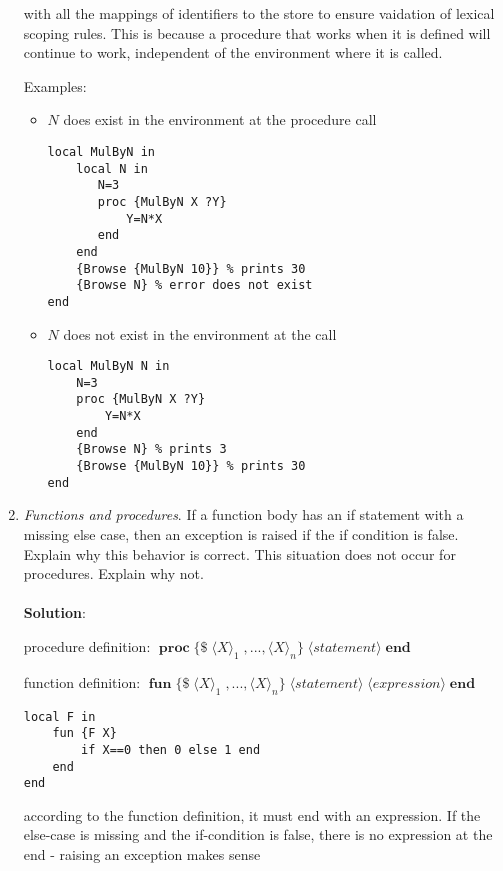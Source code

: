 \documentclass[11pt]{article}
\begin{document}
\begin{enumerate}
with all the mappings of identifiers to the store to ensure vaidation of lexical scoping rules.
This is because a procedure that works when it is deﬁned will continue to work, independent of the environment where it is called. 

Examples:

\begin{itemize}

\item $N$ does exist in the environment at the procedure call
\begin{verbatim}
local MulByN in
    local N in
       N=3
       proc {MulByN X ?Y}
           Y=N*X
       end
    end   
    {Browse {MulByN 10}} % prints 30
    {Browse N} % error does not exist
end
\end{verbatim}

\item $N$ does not exist in the environment at the call
\begin{verbatim}
local MulByN N in
    N=3
    proc {MulByN X ?Y}
        Y=N*X
    end
    {Browse N} % prints 3
    {Browse {MulByN 10}} % prints 30
end
\end{verbatim}
\end{itemize}

\newpage
\item {\itshape Functions and procedures}. If a function body has an if statement with a missing
else case, then an exception is raised if the if condition is false. Explain why this
behavior is correct. This situation does not occur for procedures. Explain why not.
\\\\
{\bfseries Solution}:

procedure definition:
\( \;\mathbf{proc} \; \{\$\; \langle X\rangle_1 \; ,..., \langle X\rangle_n\} \; \langle statement\rangle \; \mathbf{end} \;\)

function definition:
\( \;\mathbf{fun} \; \{\$\; \langle X\rangle_1 \; ,..., \langle X\rangle_n\} \; \langle statement\rangle \; \langle expression\rangle \; \mathbf{end} \;\)

\begin{verbatim}
local F in
    fun {F X}
        if X==0 then 0 else 1 end
    end
end
\end{verbatim}

according to the function definition, it must end with an expression. If the else-case is missing and the if-condition is false, there is no expression at the end - raising an exception makes sense


\end{enumerate}
\end{document}
